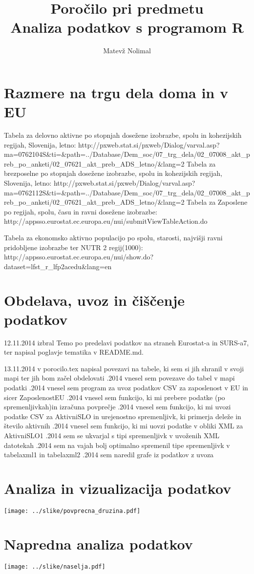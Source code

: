 \documentclass[11pt,a4paper]{article}
\begin{document}
\title{Poročilo pri predmetu \\
Analiza podatkov s programom R}
\author{Matevž Nolimal}
\maketitle

\section{Razmere na trgu dela doma in v EU}
Tabela za delovno aktivne po stopnjah dosežene izobrazbe, spolu in kohezijskih regijah, Slovenija, letno:\n
http://pxweb.stat.si/pxweb/Dialog/varval.asp?ma=0762104S&ti=&path=../Database/Dem_soc/07_trg_dela/02_07008_akt_preb_po_anketi/02_07621_akt_preb_ADS_letno/&lang=2\n
Tabela za brezposelne po stopnjah dosežene izobrazbe, spolu in kohezijskih regijah, Slovenija, letno:\n
http://pxweb.stat.si/pxweb/Dialog/varval.asp?ma=0762112S&ti=&path=../Database/Dem_soc/07_trg_dela/02_07008_akt_preb_po_anketi/02_07621_akt_preb_ADS_letno/&lang=2\n
Tabela za Zaposlene po regijah, spolu, času in ravni dosežene izobrazbe:\n
http://appsso.eurostat.ec.europa.eu/nui/submitViewTableAction.do\n

Tabela za ekonomsko aktivno populacijo po spolu, starosti, najvišji ravni pridobljene izobrazbe ter NUTR 2 regij(1000):\n
http://appsso.eurostat.ec.europa.eu/nui/show.do?dataset=lfst_r_lfp2acedu&lang=en\n


\section{Obdelava, uvoz in čiščenje podatkov}
12.11.2014 izbral Temo po predelavi podatkov na straneh Eurostat-a in SURS-a7, ter napisal poglavje tematika v README.md.

13.11.2014 v porocilo.tex napisal povezavi na tabele, ki sem si jih shranil v svoji mapi ter jih bom začel obdelovati\n
{}.2014 vnesel sem povezave do tabel v mapi podatki\n
{}.2014  vnesel sem program za uvoz podatkov CSV za zaposlenost v EU in sicer ZaposlenostEU\n
{}.2014  vnesel sem funkcijo, ki mi prebere podatke (po spremenljivkah)in izračuna povprečje\n
{}.2014  vnesel sem funkcijo, ki mi uvozi podatke CSV za AktivniSLO in urejenostno spremenljivk, ki primerja deleže in število aktivnih\n
{}.2014  vnesel sem funkcijo, ki mi uovzi podatke v obliki XML za AktivniSLO1\n
{}.2014 sem se ukvarjal s tipi spremenljivk v uvoženih XML datotekah\n
{}.2014 sem na vajah bolj optimalno spremenil tipe spremenljivk v tabelaxml1 in tabelaxml2\n
{}.2014 sem naredil grafe iz podatkov z uvoza\n
\n

\section{Analiza in vizualizacija podatkov}

\texttt{[image: ../slike/povprecna\_druzina.pdf]}

\section{Napredna analiza podatkov}

\texttt{[image: ../slike/naselja.pdf]}
\end{document}
